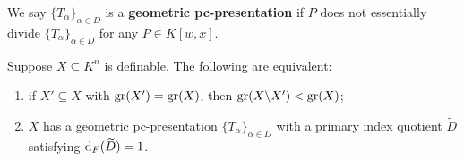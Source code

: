 We say $ \{ T_\alpha\}_{ \alpha \in D}$ is  a {\bf geometric pc-presentation} if  $P$ does not essentially divide $ \{ T_\alpha\}_{ \alpha \in D}$ for any $P \in K[w, x]$.



\begin{prop} \label{geoired}
Suppose $X \subseteq K^n$ is definable. The following are equivalent:
\begin{enumerate}
\item if $X' \subseteq X$ with $\mathrm{gr}(X')= \mathrm{gr}(X)$, then $\mathrm{gr}(X \backslash X') < \mathrm{gr}(X)$;
\item $X$ has a geometric pc-presentation  $ \{ T_\alpha\}_{ \alpha \in D}$ with a primary index quotient $\widetilde{D}$ satisfying $\mathrm{d}_F(\widetilde{D}) =1$.
\end{enumerate}
\end{prop}
